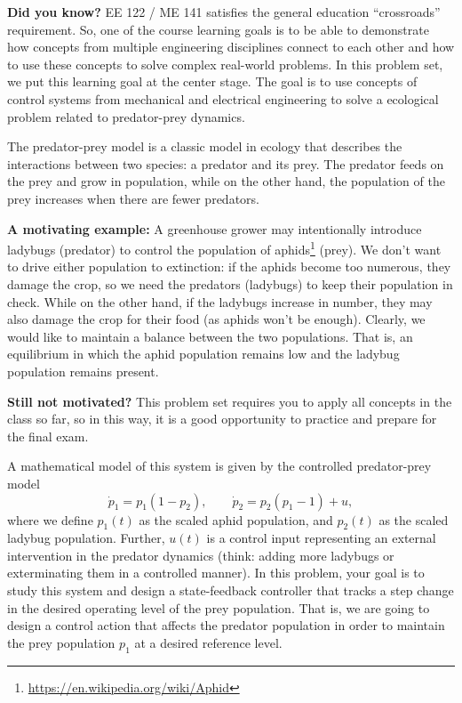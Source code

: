 \documentclass{ee122_pset}
\author{\rule{3cm}{0.4pt}} %
\begin{document}
\textbf{Did you know?} EE 122 / ME 141 satisfies the general education ``crossroads'' requirement. So, one of the course learning goals is to be able to demonstrate how concepts from multiple engineering disciplines connect to each other and how to use these concepts to solve complex real-world problems. In this problem set, we put this learning goal at the center stage. The goal is to use concepts of control systems from mechanical and electrical engineering to solve a ecological problem related to predator-prey dynamics.

The predator-prey model is a classic model in ecology that describes the interactions between two species: a predator and its prey. The predator feeds on the prey and grow in population, while on the other hand, the population of the prey increases when there are fewer predators. 

\textbf{A motivating example:} A greenhouse grower may intentionally introduce ladybugs (predator) to control the population of aphids\footnote{\url{https://en.wikipedia.org/wiki/Aphid}} (prey). We don't want to drive either population to extinction: if the aphids become too numerous, they damage the crop, so we need the predators (ladybugs) to keep their population in check. While on the other hand, if the ladybugs increase in number, they may also damage the crop for their food (as aphids won't be enough). Clearly, we would like to maintain a balance between the two populations. That is, an equilibrium in which the aphid population remains low and the ladybug population remains present.

\textbf{Still not motivated?} This problem set requires you to apply all concepts in the class so far, so in this way, it is a good opportunity to practice and prepare for the final exam. 

A mathematical model of this system is given by the controlled predator-prey model
\[
\dot p_1 = p_1(1-p_2),
\qquad
\dot p_2 = p_2(p_1-1)+u,
\]
where we define
$p_1(t)$ as the scaled aphid population, and
$p_2(t)$ as the scaled ladybug population. Further, \(u(t)\) is a control input representing an external intervention in the predator dynamics (think: adding more ladybugs or exterminating them in a controlled manner). In this problem, your goal is to study this system and design a state-feedback controller that tracks a step change in the desired operating level of the prey population. That is, we are going to design a control action that affects the predator population in order to maintain the prey population \(p_1\) at a desired reference level.
\end{document}
